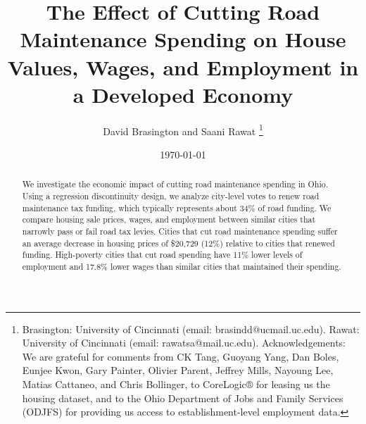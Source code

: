 \documentclass[AEJ]{AEA}
\begin{document}
\title{The Effect of Cutting Road Maintenance Spending on House Values,  Wages, and Employment in a Developed Economy}
\author{David Brasington and Saani Rawat \thanks{Brasington: University of Cincinnati (email: brasindd@ucmail.uc.edu). Rawat: University of Cincinnati (email: rawatsa@mail.uc.edu). Acknowledgements: We are grateful for comments from CK Tang, Guoyang Yang, Dan Boles, Eunjee Kwon, Gary Painter, Olivier Parent, Jeffrey Mills, Nayoung Lee, Matias Cattaneo, and Chris Bollinger, to CoreLogic® for leasing us the housing dataset, and to the Ohio Department of Jobs and Family Services (ODJFS) for providing us access to establishment-level employment data.}}
\date{\today}

\begin{abstract} 
    We investigate the economic impact of cutting road maintenance spending in Ohio. Using a regression discontinuity design, we analyze city-level votes to renew road maintenance tax funding, which typically represents about 34\% of road funding. We compare housing sale prices, wages, and employment between similar cities that narrowly pass or fail road tax levies. Cities that cut road maintenance spending suffer an average decrease in housing prices of \$20,729 (12\%) relative to cities that renewed funding. High-poverty cities that cut road spending have 11\% lower levels of employment and 17.8\% lower wages than similar cities that maintained their spending.
\end{abstract}
 
\maketitle







\pagebreak

\appendix

\end{document}
